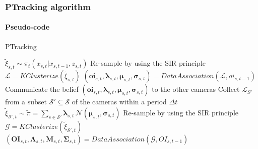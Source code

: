 \begin{frame}
	\frametitle{PTracking algorithm}
	\framesubtitle{Pseudo-code}
	
	\vspace{0.35cm}
	
	\begin{algorithm}[H]
		\tiny
		\caption{PTracking}
		\BlankLine
		\BlankLine
		\BlankLine
		\Begin
		{
			$ \tilde{\xi}_{s,t} \sim \pi_t (x_{s,t} | x_{s,t-1},z_{s,t}) $
			\BlankLine
			Re-sample by using the SIR principle\\
			\BlankLine
			$ \mathcal{L} = KClusterize(\tilde{\xi}_{s,t}) $
			\BlankLine
			$ (\boldsymbol{oi}_{s,t},\boldsymbol\lambda_{s,t},\boldsymbol\mu_{s,t},\boldsymbol\sigma_{s,t}) = DataAssociation(\mathcal{L}, oi_{s,t-1}) $
			\BlankLine
			Communicate the belief $ (\boldsymbol{oi}_{s,t},\boldsymbol\lambda_{s,t},\boldsymbol\mu_{s,t},\boldsymbol\sigma_{s,t}) $ to the other cameras
		}
		\BlankLine
		\Begin
		{
			Collect $ \mathcal{L}_{S'} $ from a subset $ \mathcal{S'} \subseteq \mathcal{S} $ of the cameras within a period $ \Delta t $
			\BlankLine
			$ \tilde{\xi}_{\mathcal{S'},t} \sim \tilde\pi = \sum_{s \in \mathcal{S'}} \boldsymbol\lambda_{s,t} \, \mathcal{N} (\boldsymbol\mu_{s,t},\boldsymbol\sigma_{s,t}) $
			\BlankLine
			Re-sample by using the SIR principle\\
			\BlankLine
			$ \mathcal{G} = KClusterize(\tilde\xi_{{\mathcal{S'},t}}) $
			\BlankLine
			$ (\boldsymbol{OI}_{s,t},\boldsymbol\Lambda_{s,t},\boldsymbol{M}_{s,t},\boldsymbol\Sigma_{s,t}) = DataAssociation(\mathcal{G},OI_{s,t-1}) $
		}
	\end{algorithm}
\end{frame}

